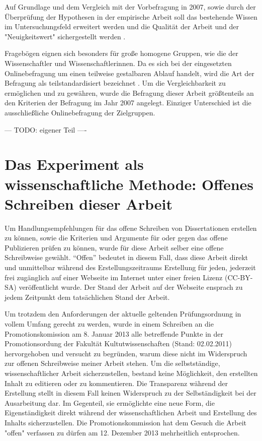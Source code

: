 Auf Grundlage und dem Vergleich mit der Vorbefragung in 2007, sowie durch der Überprüfung der Hypothesen in der empirische Arbeit soll das bestehende Wissen im Untersuchungsfeld erweitert werden und die Qualität der Arbeit und der "Neuigkeitswert" sichergestellt werden \cite{raab_2012_fragebogen}.

Fragebögen eignen sich besonders für große homogene Gruppen, wie die der Wissenschaftler und Wissenschaftlerinnen. Da es sich bei der eingesetzten Onlinebefragung um einen teilweise gestalbaren Ablauf handelt, wird die Art der Befragung als teilstandardisiert bezeichnet \cite{raab_2012_fragebogen}. Um die Vergleichbarkeit zu ermöglichen und zu gewähren, wurde die Befragung dieser Arbeit größtenteils an den Kriterien der Befragung im Jahr 2007 angelegt. Einziger Unterschied ist die ausschließliche Onlinebefragung der Zielgruppen.

--- TODO: eigener Teil ----

\section{Das Experiment als wissenschaftliche Methode: Offenes Schreiben dieser Arbeit}
Um Handlungsempfehlungen für das offene Schreiben von Dissertationen erstellen zu können, sowie die Kriterien und Argumente für oder gegen das offene Publizieren prüfen zu können, wurde für diese Arbeit selber eine offene Schreibweise gewählt. “Offen” bedeutet in diesem Fall, dass diese Arbeit direkt und unmittelbar während des Erstellungszeitraums Erstellung für jeden, jederzeit frei zugänglich auf einer Webseite im Internet unter einer freien Lizenz (CC-BY-SA) veröffentlicht wurde. Der Stand der Arbeit auf der Webseite ensprach zu jedem Zeitpunkt dem tatsächlichen Stand der Arbeit. 

Um trotzdem den Anforderungen der aktuelle geltenden Prüfungsordnung in vollem Umfang gerecht zu werden, wurde in einem Schreiben an die Promotionskomission am 8. Januar 2013 alle betreffende Punkte in der Promotionsordung der Fakultät Kultutwissenschaften (Stand: 02.02.2011) hervorgehoben und versucht zu begründen, warum diese nicht im Widerspruch zur offenen Schreibweise meiner Arbeit stehen. Um die selbstständige, wissenschaftlicher Arbeit sicherzustellen, bestand keine Möglichkeit, den erstellten Inhalt zu editieren oder zu kommentieren. Die Transparenz während der Erstellung stellt in diesem Fall keinen Widerspruch zu der Selbständigkeit bei der Ausarbeitung dar. Im Gegenteil, sie ermöglichte eine neue Form, die Eigenständigkeit direkt während der wissenschaftlichen Arbeit und Erstellung des Inhalts sicherzustellen. Die Promotionskommission hat dem Gesuch die Arbeit "offen" verfassen zu dürfen am 12. Dezember 2013 mehrheitlich entsprochen.

